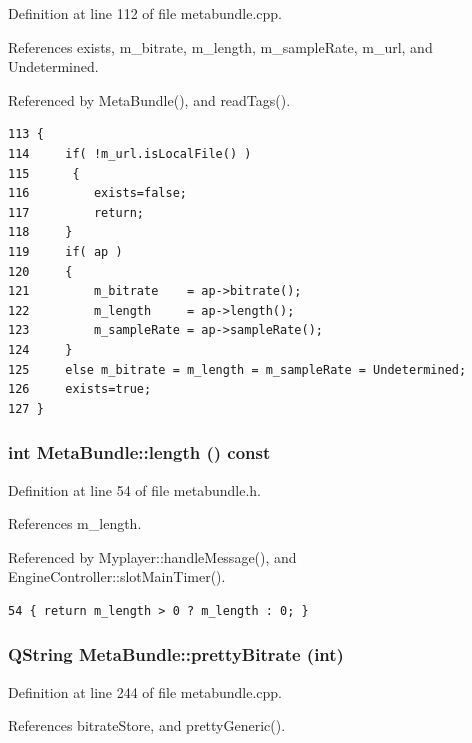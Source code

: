 Definition at line 112 of file metabundle.cpp.

References exists, m\_\-bitrate, m\_\-length, m\_\-sample\-Rate, m\_\-url, and Undetermined.

Referenced by Meta\-Bundle(), and read\-Tags().



\footnotesize\begin{verbatim}113 {
114     if( !m_url.isLocalFile() )
115      {
116         exists=false;    
117         return;
118     }   
119     if( ap )
120     {
121         m_bitrate    = ap->bitrate();
122         m_length     = ap->length();
123         m_sampleRate = ap->sampleRate();
124     }
125     else m_bitrate = m_length = m_sampleRate = Undetermined;
126     exists=true;
127 }
\end{verbatim}\normalsize 
{}
\subsubsection{\setlength{\rightskip}{0pt plus 5cm}int Meta\-Bundle::length () const\hspace{0.3cm}{\tt  [inline]}}\label{classMetaBundle_MetaBundlea5}




Definition at line 54 of file metabundle.h.

References m\_\-length.

Referenced by Myplayer::handle\-Message(), and Engine\-Controller::slot\-Main\-Timer().



\footnotesize\begin{verbatim}54 { return m_length > 0 ? m_length : 0; }
\end{verbatim}\normalsize 
{}
\subsubsection{\setlength{\rightskip}{0pt plus 5cm}QString Meta\-Bundle::pretty\-Bitrate (int)\hspace{0.3cm}{\tt  [static]}}\label{classMetaBundle_MetaBundlee0}




Definition at line 244 of file metabundle.cpp.

References bitrate\-Store, and pretty\-Generic().



